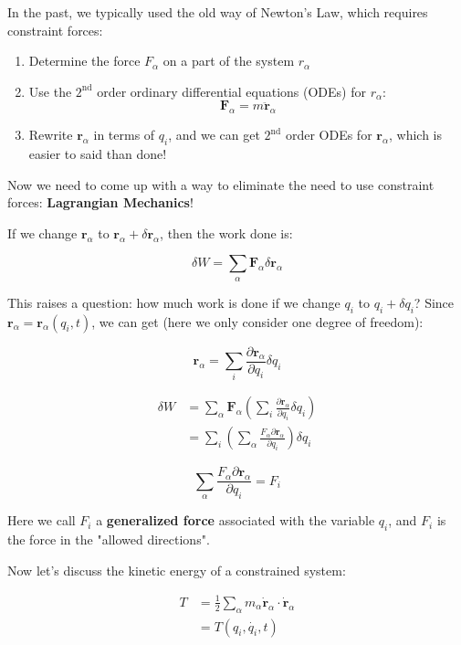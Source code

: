 \documentclass{article}
\theoremstyle{definition}
\theoremstyle{plain}
\theoremstyle{remark}
\begin{document}
In the past, we typically used the old way of Newton's Law, which requires constraint forces:

\begin{enumerate}
    \item Determine the force $F_\alpha$ on a part of the system $r_\alpha$
    \item Use the $2^{\text{nd}}$ order ordinary differential equations (ODEs) for $r_\alpha$: 
    \[
        \mathbf{F}_\alpha = m \ddot{\mathbf{r}}_\alpha
    \]
    \item Rewrite $\mathbf{r}_\alpha$ in terms of $q_i$, and we can get $2^{\text{nd}}$ order ODEs for $\mathbf{r}_\alpha$, which is easier to said than done!
\end{enumerate}

Now we need to come up with a way to eliminate the need to use constraint forces: \textbf{Lagrangian Mechanics}!

If we change $\mathbf{r}_\alpha$ to $\mathbf{r}_\alpha+\delta \mathbf{r}_\alpha$, then the work done is:

\[
   \delta W = \sum_{\alpha} \mathbf{F}_\alpha \delta \mathbf{r}_\alpha
\]

This raises a question: how much work is done if we change $q_i$ to $q_i+\delta q_i$? Since $\mathbf{r}_\alpha = \mathbf{r}_\alpha(q_i, t)$, we can get (here we only consider one degree of freedom):

\[
   \mathbf{r}_\alpha = \sum_{i} \frac{\partial \mathbf{r}_\alpha}{\partial q_i} \delta q_i
\]

\begin{align*}
    \delta W &= \sum_{\alpha} \mathbf{F}_\alpha \left(\sum_{i} \frac{\partial \mathbf{r}_\alpha}{\partial q_i} \delta q_i \right) \\
             &= \sum_{i} \left(\sum_{\alpha} \frac{F_{\alpha} \partial \mathbf{r}_\alpha}{\partial q_i} \right) \delta q_i
\end{align*}

\[
   \sum_{\alpha} \frac{F_{\alpha} \partial \mathbf{r}_\alpha}{\partial q_i} = F_i
\]

Here we call $F_i$ a \textbf{generalized force} associated with the variable $q_i$, and $F_i$ is the force in the "allowed directions". 

Now let's discuss the kinetic energy of a constrained system:

\begin{align*}
    T &= \frac{1}{2} \sum_{\alpha} m_\alpha \dot{\mathbf{r}}_\alpha \cdot \dot{\mathbf{r}}_\alpha \\
      &= T(q_i, \dot{q_i}, t) \\
\end{align*}
\end{document}

